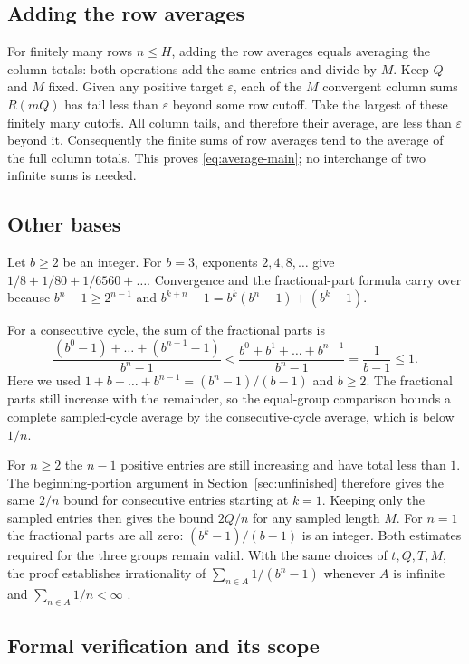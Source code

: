 \documentclass[10pt]{article}
\theoremstyle{plain}
\theoremstyle{definition}
\theoremstyle{remark}
\begin{document}
\subsection{Adding the row averages}\label{app:proof}

For finitely many rows $n\le H$, adding the row averages equals averaging
the column totals: both operations add the same entries and divide by $M$.
Keep $Q$ and $M$ fixed. Given any positive target $\varepsilon$, each of
the $M$ convergent column sums $R(mQ)$ has tail less than $\varepsilon$
beyond some row cutoff. Take the largest of these finitely many cutoffs.
All column tails, and therefore their average, are less than $\varepsilon$
beyond it. Consequently the finite sums of row averages tend to the
average of the full column totals. This proves \eqref{eq:average-main};
no interchange of two infinite sums is needed.

\subsection{Other bases}\label{app:bases}

Let $b\ge2$ be an integer. For $b=3$, exponents $2,4,8,\dots$ give
$1/8+1/80+1/6560+\dots$. Convergence and the fractional-part formula carry
over because $b^n-1\ge2^{n-1}$ and
$b^{k+n}-1=b^k(b^n-1)+(b^k-1)$.

For a consecutive cycle, the sum of the fractional parts is
\[
 \frac{(b^0-1)+\dots+(b^{n-1}-1)}{b^n-1}
 <\frac{b^0+b^1+\dots+b^{n-1}}{b^n-1}
 =\frac1{b-1}\le1.
\]
Here we used $1+b+\dots+b^{n-1}=(b^n-1)/(b-1)$ and $b\ge2$.
The fractional parts still increase with the remainder, so the equal-group
comparison bounds a complete sampled-cycle average by the consecutive-cycle
average, which is below $1/n$.

For $n\ge2$ the $n-1$ positive entries are still increasing and have total
less than $1$. The beginning-portion argument in
Section~\ref{sec:unfinished} therefore gives the same $2/n$ bound for
consecutive entries starting at $k=1$. Keeping only the sampled entries
then gives the bound $2Q/n$ for any sampled length $M$. For $n=1$ the
fractional parts are all zero: $(b^k-1)/(b-1)$ is an integer.
Both estimates required for the three groups remain valid. With the same
choices of $t,Q,T,M$, the proof establishes irrationality of
$\sum_{n\in A}1/(b^n-1)$ whenever $A$ is infinite and
$\sum_{n\in A}1/n<\infty$ \cite[Theorem~A.1]{shortpaper}.

\subsection{Formal verification and its scope}\label{app:lean}
\end{document}
